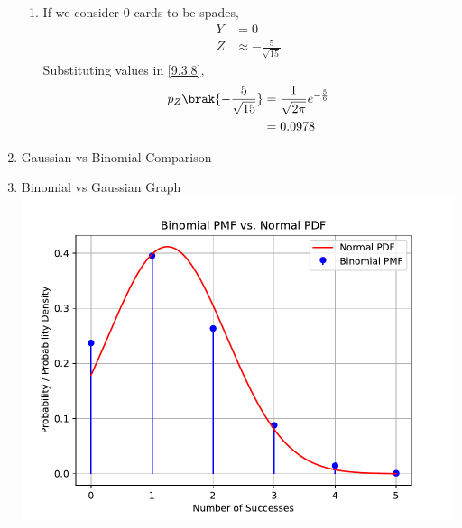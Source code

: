 \documentclass[journal,12pt,twocolumn]{IEEEtran}
\theoremstyle{remark}
\begin{document}
\begin{enumerate}[label=(\roman*)]
\begin{enumerate}[label=(\alph*)]
\item If we consider 0 cards to be spades,
\begin{align}
Y &= 0\\
Z &\approx -\frac{5}{\sqrt{15}}
\end{align}
Substituting values in \eqref{9.3.8},
\begin{align}
p_Z\brak{-\frac{5}{\sqrt{15}}}&= \frac{1}{\sqrt{2\pi}} e^{-\frac{5}{6}}\\
			      &= 0.0978
\end{align}
\end{enumerate}
\item Gaussian vs Binomial Comparison
\begin{table}[!ht]

\end{table}
\item Binomial vs Gaussian Graph\\
\includegraphics[width=\columnwidth]{./figs/plot.pdf}
\end{enumerate}
\end{document}
